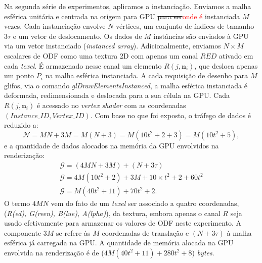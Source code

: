 Na segunda série de experimentos, aplicamos a instanciação. Enviamos a malha esférica unitária e centrada na origem para GPU \sout{para ser}\textcolor{red}{onde é} instanciada $M$ vezes. Cada instanciação envolve $N$ vértices, um conjunto de índices de tamanho $3\tau$ e um vetor de deslocamento. Os dados de $M$ instâncias são enviados à GPU via um vetor instanciado (\textit{instanced array}). Adicionalmente, enviamos $N\times M$ escalares de ODF como uma textura 2D com apenas um canal $RED$ ativado em cada \textit{texel}. É armazenado nesse canal um elemento $R(j, \mathbf{n}_i)$, que desloca apenas um ponto $P_i$ na malha esférica instanciada. A cada requisição de desenho para $M$ glifos, via o comando \textit{glDrawElementsInstanced},
a malha esférica instanciada é deformada, redimensionada e deslocada para a sua célula na GPU. Cada $R(j, \mathbf{n}_i)$ 
é acessado no \textit{vertex shader} com as coordenadas $(Instance\_ID, Vertex\_ID)$. Com base no que foi exposto, o tráfego de dados é reduzido a:
\begin{equation}
\label{eq::mem_odfs_trafego_2.1}
    \mathscr{N} =  MN + 3M = M(N+3) = M(10 t^2 + 2 + 3) = M(10t^2 + 5),
\end{equation}
e a quantidade de dados alocados na memória da GPU envolvidos na renderização:
\begin{equation}
\label{eq::mem_odfs_ocupancia_2.1}
\begin{array}{l}
    \mathscr{G} =  (4MN + 3M) + (N + 3\tau) \\
    \mathscr{G} = 4M(10t^2+2) + 3M + 10\times t^2 + 2 + 60t^2 \\
    \mathscr{G} = M(40t^2 + 11) + 70t^2 + 2 .
    \end{array}
\end{equation}
O termo $4MN$ vem do fato de um \textit{texel} ser associado a quatro coordenadas, (\textit{R(ed), G(reen), B(lue), A(lpha)}), da textura, embora apenas o canal $R$ seja usado efetivamente para armazenar os valores de ODF neste experimento. A componente $3M$ se refere às $M$ coordenadas de translação e $(N + 3\tau)$ à malha esférica já carregada na GPU. A quantidade de memória alocada na GPU envolvida na renderização é de ($4M(40t^2 + 11) + 280t^2 + 8$) \textit{bytes}.

